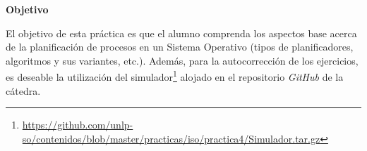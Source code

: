 \documentclass[a4paper,11pt]{exam}
\begin{document}
\maketitle

\textbf{Objetivo}

El objetivo de esta práctica es que el alumno comprenda los aspectos base acerca de la planificación de procesos en un Sistema Operativo (tipos de planificadores, algoritmos y sus variantes, etc.). Además, para la autocorrección de los ejercicios, es deseable la utilización del simulador\footnote{\url{https://github.com/unlp-so/contenidos/blob/master/practicas/iso/practica4/Simulador.tar.gz}} alojado en el repositorio \emph{GitHub} de la cátedra.


\end{document}
